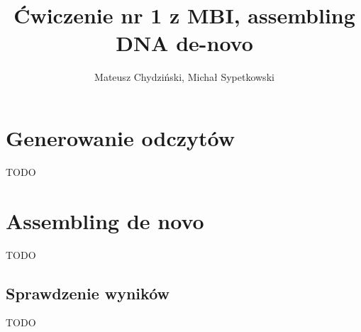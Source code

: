 \documentclass[a4paper]{article}
\begin{document}
\title{Ćwiczenie nr 1 z MBI, assembling DNA de-novo}
\author{Mateusz Chydziński, Michał Sypetkowski}
\maketitle


\section{Generowanie odczytów}
TODO

\section{Assembling de novo}
TODO
\subsection {Sprawdzenie wyników}
TODO
\end{document}
